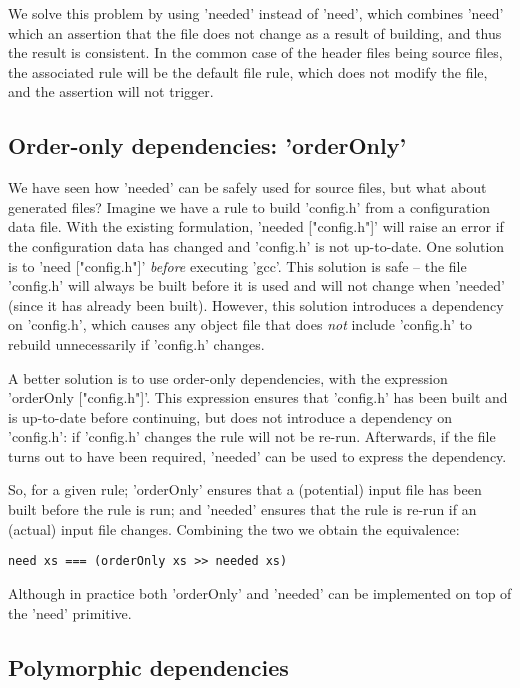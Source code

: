 We solve this problem by using \lst'needed' instead of \lst'need', which
combines \lst'need' which an assertion that the file does not change as a result
of building, and thus the result is consistent. In the common case of the header
files being source files, the associated rule will be the default file rule,
which does not modify the file, and the assertion will not trigger.

\subsection{Order-only dependencies: \lst'orderOnly'}

We have seen how \lst'needed' can be safely used for source files, but what
about generated files? Imagine we have a rule to build \lst'config.h' from a
configuration data file. With the existing formulation,
\lst'needed ["config.h"]' will raise an error if the configuration data has
changed and \lst'config.h' is not up-to-date. One solution is to \lst'need ["config.h"]'
\emph{before} executing \lst'gcc'. This solution is safe -- the file
\lst'config.h' will always be built before it is used and will not change when
\lst'needed' (since it has already been built). However, this solution
introduces a dependency on \lst'config.h', which causes any object file that
does \emph{not} include \lst'config.h' to rebuild unnecessarily if
\lst'config.h' changes.

A better solution is to use order-only dependencies, with the expression
\lst'orderOnly ["config.h"]'. This expression ensures that \lst'config.h' has
been built and is up-to-date before continuing, but does not introduce a
dependency on \lst'config.h': if \lst'config.h' changes
the rule will not be re-run. Afterwards, if the file turns out to have been
required, \lst'needed' can be used to express the dependency.

So, for a given rule; \lst'orderOnly' ensures that a (potential) input
file has been built before the rule is run; and \lst'needed' ensures
that the rule is re-run if an (actual) input file changes. Combining
the two we obtain the equivalence:

\begin{lstlisting}
need xs === (orderOnly xs >> needed xs)
\end{lstlisting}

\noindent Although in practice both \lst'orderOnly' and \lst'needed' can be
implemented on top of the \lst'need' primitive.

\subsection{Polymorphic dependencies\label{sec:polymorphic}}


